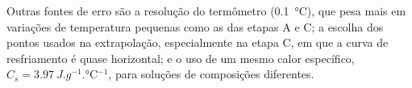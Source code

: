 Outras fontes de erro são a resolução do termômetro (\SI{0,1}{\degreeCelsius}), que pesa mais em variações de temperatura pequenas como as das etapas A e C; a escolha dos pontos usados na extrapolação, especialmente na etapa C, em que a curva de resfriamento é quase horizontal; e o uso de um mesmo calor específico, $C_s = \SI{3,97}{J.g^{-1}.\degreeCelsius^{-1}}$, para soluções de composições diferentes.
